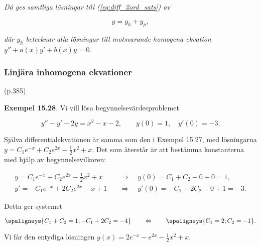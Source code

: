 \documentclass[11pt]{article}
\begin{document}
\textit{Då ges samtliga lösningar till (\ref{eq:diff_2ord_sats}) av}

\begin{equation}
    y = y_h + y_p,
\end{equation}

\textit{där $y_h$ betecknar alla lösningar till motsvarande homogena ekvation $y'' + a(x)y' + b(x)y = 0$.}

\newpage
\subsubsection{Linjära inhomogena ekvationer} (p.385)

\textbf{Exempel 15.28}. Vi vill lösa begynnelsevärdesproblemet

\begin{equation}
    y'' - y' - 2y = x^2 - x - 2, \qquad y(0) = 1, \quad y'(0) = -3.
\end{equation}

Själva differentialekvationen är samma som den i Exempel 15.27, med lösningarna $y = C_1e^{-x} + C_2e^{2x}-\frac{1}{2}x^2 + x$. Det som återstår är att bestämma konstanterna med hjälp av begynnelsevilkoren:

\begin{align}
    y  = C_1e^{-x} + C_2e^{2x} - \tfrac{1}{2}x^2 + x \quad &\Rightarrow \quad y(0)  = C_1 + C_2 - 0 + 0 = 1,\\
    y' = -C_1e^{-x} + 2C_2e^{2x} - x + 1             \quad &\Rightarrow \quad y'(0) = -C_1 + 2C_2 - 0 + 1 = -3.
\end{align}

Detta ger systemet

\begin{equation}
    \spalignsys{
         C_1 +  C_2 =  1;
        -C_1 + 2C_2 = -4
    }
    \qquad \Leftrightarrow \qquad
    \spalignsys{
        C_1 = 2;
        C_2 = -1
    }.
\end{equation}

Vi får den entydiga lösningen $y(x) = 2e^{-x} - e^{2x} - \tfrac{1}{2}x^2 + x$.
\end{document}
